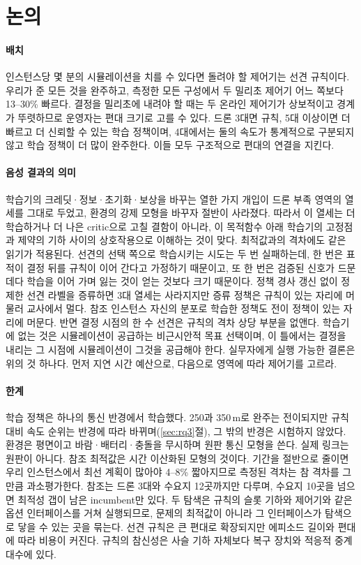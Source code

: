\documentclass[final,5p,times,twocolumn]{elsarticle}
\begin{document}
\section{논의}
\label{sec:discussion}

\paragraph{배치}
인스턴스당 몇 분의 시뮬레이션을 치를 수 있다면 돌려야 할 제어기는 선견 규칙이다. 우리가 준 모든
것을 완주하고, 측정한 모든 구성에서 두 밀리초 제어기 어느 쪽보다 13--30\% 빠르다. 결정을 밀리초에
내려야 할 때는 두 온라인 제어기가 상보적이고 경계가 뚜렷하므로 운영자는 편대 크기로 고를 수 있다.
드론 3대면 규칙, 5대 이상이면 더 빠르고 더 신뢰할 수 있는 학습 정책이며, 4대에서는 둘의 속도가
통계적으로 구분되지 않고 학습 정책이 더 많이 완주한다. 이들 모두 구조적으로 편대의 연결을 지킨다.

\paragraph{음성 결과의 의미}
학습기의 크레딧·정보·초기화·보상을 바꾸는 열한 가지 개입이 드론 부족 영역의 열세를 그대로 두었고, 환경의
강제 모형을 바꾸자 절반이 사라졌다. 따라서 이 열세는 더 학습하거나 더 나은 critic으로 고칠 결함이
아니라, 이 목적함수 아래 학습기의 고정점과 제약의 기하 사이의 상호작용으로 이해하는 것이 맞다.
최적값과의 격차에도 같은 읽기가 적용된다. 선견의 선택 쪽으로 학습시키는 시도는 두 번 실패하는데, 한
번은 표적이 결정 뒤를 규칙이 이어 간다고 가정하기 때문이고, 또 한 번은 검증된 신호가 드문 데다 학습을
이어 가며 잃는 것이 얻는 것보다 크기 때문이다. 정책 경사 갱신 없이 정제한 선견 라벨을 증류하면 3대
열세는 사라지지만 증류 정책은 규칙이 있는 자리에 머물러 교사에서 멀다. 참조 인스턴스 자신의 분포로 학습한 정책도 전이 정책이 있는 자리에 머문다.
반면 결정 시점의 한 수 선견은 규칙의 격차 상당 부분을 없앤다. 학습기에 없는 것은 시뮬레이션이 공급하는 비근시안적 목표 선택이며, 이
틀에서는 결정을 내리는 그 시점에 시뮬레이션이 그것을 공급해야 한다. 실무자에게 실행 가능한 결론은
위의 것 하나다. 먼저 지연 시간 예산으로, 다음으로 영역에 따라 제어기를 고르라.

\paragraph{한계}
학습 정책은 하나의 통신 반경에서 학습했다. 250과 350\,m로 완주는 전이되지만 규칙 대비 속도
순위는 반경에 따라 바뀌며(\ref{sec:rq3}절), 그 밖의 반경은 시험하지 않았다. 환경은 평면이고
바람·배터리·충돌을 무시하며 원판 통신 모형을 쓴다. 실제 링크는 원판이 아니다. 참조 최적값은 시간
이산화된 모형의 것이다. 기간을 절반으로 줄이면 우리 인스턴스에서 최선 계획이 많아야 4--8\% 짧아지므로
측정된 격차는 참 격차를 그만큼 과소평가한다. 참조는 드론 3대와 수요지 12곳까지만 다루며, 수요지 10곳을
넘으면 최적성 갭이 남은 incumbent만 있다. 두 탐색은 규칙의 슬롯 기하와 제어기와 같은 옵션 인터페이스를
거쳐 실행되므로, 문제의 최적값이 아니라 그 인터페이스가 탐색으로 닿을 수 있는 곳을 묶는다. 선견 규칙은 큰 편대로 확장되지만 에피소드 길이와 편대에 따라 비용이
커진다. 규칙의 참신성은 사슬 기하 자체보다
복구 장치와 적응적 중계 대수에 있다.
\end{document}
